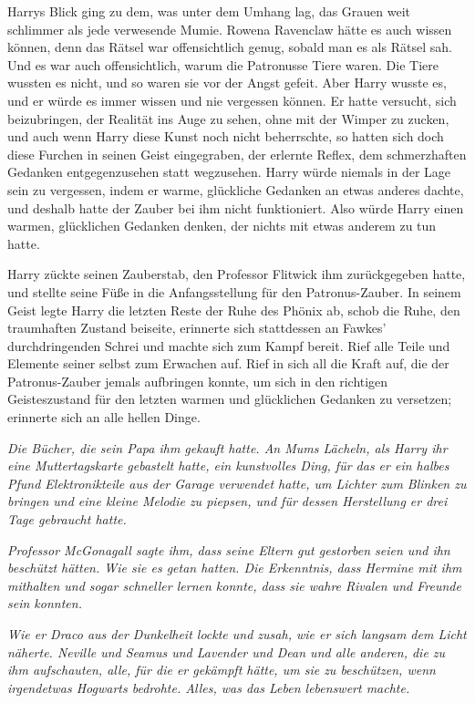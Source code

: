 Harrys Blick ging zu dem, was unter dem Umhang lag, das Grauen weit schlimmer
als jede verwesende Mumie. Rowena Ravenclaw hätte es auch wissen können, denn
das Rätsel war offensichtlich genug, sobald man es als Rätsel sah. Und es war
auch offensichtlich, warum die Patronusse Tiere waren. Die Tiere wussten es
nicht, und so waren sie vor der Angst gefeit. Aber Harry wusste es, und er würde
es immer wissen und nie vergessen können. Er hatte versucht, sich beizubringen,
der Realität ins Auge zu sehen, ohne mit der Wimper zu zucken, und auch wenn
Harry diese Kunst noch nicht beherrschte, so hatten sich doch diese Furchen in
seinen Geist eingegraben, der erlernte Reflex, dem schmerzhaften Gedanken
entgegenzusehen statt wegzusehen. Harry würde niemals in der Lage sein zu
vergessen, indem er warme, glückliche Gedanken an etwas anderes dachte, und
deshalb hatte der Zauber bei ihm nicht funktioniert. Also würde Harry einen
warmen, glücklichen Gedanken denken, der nichts mit etwas anderem zu tun hatte.

Harry zückte seinen Zauberstab, den Professor Flitwick ihm zurückgegeben hatte,
und stellte seine Füße in die Anfangsstellung für den Patronus-Zauber. In seinem
Geist legte Harry die letzten Reste der Ruhe des Phönix ab, schob die Ruhe, den
traumhaften Zustand beiseite, erinnerte sich stattdessen an Fawkes'
durchdringenden Schrei und machte sich zum Kampf bereit. Rief alle Teile und
Elemente seiner selbst zum Erwachen auf. Rief in sich all die Kraft auf, die der
Patronus-Zauber jemals aufbringen konnte, um sich in den richtigen
Geisteszustand für den letzten warmen und glücklichen Gedanken zu versetzen;
erinnerte sich an alle hellen Dinge.

\emph{Die Bücher, die sein Papa ihm gekauft hatte. An Mums Lächeln, als Harry
ihr eine Muttertagskarte gebastelt hatte, ein kunstvolles Ding, für das er ein
halbes Pfund Elektronikteile aus der Garage verwendet hatte, um Lichter zum
Blinken zu bringen und eine kleine Melodie zu piepsen, und für dessen
Herstellung er drei Tage gebraucht hatte.}

\emph{Professor McGonagall sagte ihm, dass seine Eltern gut gestorben seien und
ihn beschützt hätten. Wie sie es getan hatten. Die Erkenntnis, dass Hermine mit
ihm mithalten und sogar schneller lernen konnte, dass sie wahre Rivalen und
Freunde sein konnten.}

\emph{Wie er Draco aus der Dunkelheit lockte und zusah, wie er sich langsam dem
Licht näherte. Neville und Seamus und Lavender und Dean und alle anderen, die
zu ihm aufschauten, alle, für die er gekämpft hätte, um sie zu beschützen, wenn
irgendetwas Hogwarts bedrohte. Alles, was das Leben lebenswert machte.}

